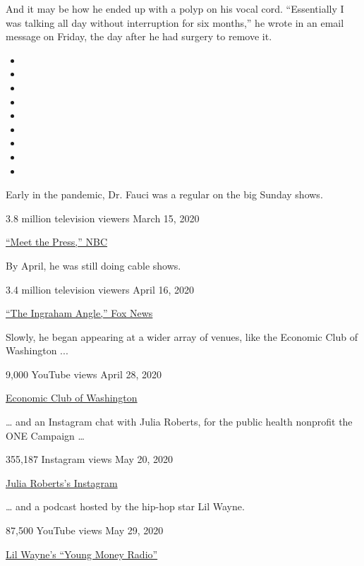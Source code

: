 And it may be how he ended up with a polyp on his vocal cord.
``Essentially I was talking all day without interruption for six
months,'' he wrote in an email message on Friday, the day after he had
surgery to remove it.

\begin{itemize}
\item
\item
\item
\item
\item
\item
\item
\item
\item
\end{itemize}

Early in the pandemic, Dr. Fauci was a regular on the big Sunday shows.

3.8 million television viewers \textbar{} March 15, 2020

\href{https://www.nbcnews.com/meet-the-press/video/full-fauci-the-numbers-don-t-tell-us-yet-if-virus-spread-is-blunted-80680517562?cid=sm_npd_nn_tw_mtp}{``Meet
the Press,'' NBC}

By April, he was still doing cable shows.

3.4 million television viewers \textbar{} April 16, 2020

\href{https://video.foxnews.com/v/6150154055001\#sp=show-clips}{``The
Ingraham Angle,'' Fox News}

Slowly, he began appearing at a wider array of venues, like the Economic
Club of Washington ...

9,000 YouTube views \textbar{} April 28, 2020

\href{https://www.youtube.com/watch?time_continue=5\&v=u7QlGYkqnOs\&feature=emb_logo}{Economic
Club of Washington}

\ldots{} and an Instagram chat with Julia Roberts, for the public health
nonprofit the ONE Campaign \ldots{}

355,187 Instagram views \textbar{} May 20, 2020

\href{https://www.instagram.com/p/CAdEZzBAvzf/}{Julia Roberts's
Instagram}

\ldots{} and a podcast hosted by the hip-hop star Lil Wayne.

87,500 YouTube views \textbar{} May 29, 2020

\href{https://twitter.com/LilTunechi/status/1266895927127805952}{Lil
Wayne's ``Young Money Radio''}

